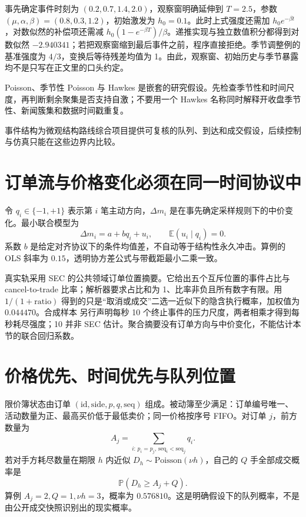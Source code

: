 

事先确定事件时刻为 $(0.2,0.7,1.4,2.0)$，观察窗明确延伸到 $T=2.5$，参数 $(\mu,\alpha,\beta)=(0.8,0.3,1.2)$，初始激发为 $h_0=0.1$。此时上式强度还需加 $h_0e^{-\beta t}$，对数似然的补偿项还需减 $h_0(1-e^{-\beta T})/\beta$。递推实现与独立数值积分都得到对数似然 $-2.940341$；若把观察窗缩到最后事件之前，程序直接拒绝。季节调整例的基准强度为 $4/3$，变换后等待残差均值为 1。由此，观察窗、初始历史与季节暴露均不是只写在正文里的口头约定。

\begin{diagnostic}
Poisson、季节性 Poisson 与 Hawkes 是嵌套的研究假设。先检查季节性和时间尺度，再判断剩余聚集是否支持自激；不要用一个 Hawkes 名称同时解释开收盘季节性、新闻簇集和数据时间戳重复。
\end{diagnostic}

事件结构为微观结构路线综合项目提供可复核的队列、到达和成交假设，后续控制与仿真只能在这些边界内比较。

\section{订单流与价格变化必须在同一时间协议中}

令 $q_i\in\{-1,+1\}$ 表示第 $i$ 笔主动方向，$\Delta m_i$ 是在事先确定采样规则下的中价变化。最小联合模型为
\[
 \Delta m_i=a+bq_i+u_i,
 \qquad \mathbb E(u_i\mid q_i)=0.
\]
系数 $b$ 是给定对齐协议下的条件均值差，不自动等于结构性永久冲击。算例的 OLS 斜率为 $0.15$，透明协方差公式与带截距最小二乘一致。

真实轨采用 SEC 的公共领域订单位置摘要。它给出五个互斥位置的事件占比与 cancel-to-trade 比率\cite{sec2014orderplacement}；解析器要求占比和为 1、比率非负且所有数字有限。用 $1/(1+\text{ratio})$ 得到的只是“取消或成交”二选一近似下的隐含执行概率，加权值为 $0.044470$。合成样本 另行声明每秒 10 个终止事件的压力尺度，两者相乘才得到每秒耗尽强度；10 并非 SEC 估计。聚合摘要没有订单方向与中价变化，不能估计本节的联合回归系数。

\section{价格优先、时间优先与队列位置}

限价簿状态由订单 $(\mathrm{id},\mathrm{side},p,q,\mathrm{seq})$ 组成。被动簿至少满足：订单编号唯一、活动数量为正、最高买价低于最低卖价；同一价格按序号 FIFO。对订单 $j$，前方数量为
\[
 A_j=\sum_{i:\,p_i=p_j,\,\mathrm{seq}_i<\mathrm{seq}_j}q_i.
\]
若对手方耗尽数量在期限 $h$ 内近似 $D_h\sim\mathrm{Poisson}(\nu h)$，自己的 $Q$ 手全部成交概率是
\[
 \mathbb P(D_h\ge A_j+Q).
\]
算例 $A_j=2,Q=1,\nu h=3$，概率为 $0.576810$。这是明确假设下的队列概率，不是由公开成交快照识别出的现实概率。

